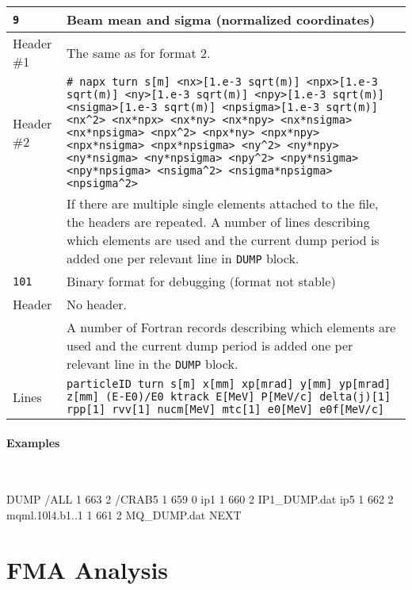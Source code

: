 \begin{center}
\begin{longtable}{|p{1.8cm}|p{13.8cm}|}
        \hline
        \rowcolor{blue!15}
        \texttt{9} & Beam mean and sigma (normalized coordinates) \\
        \hline
        Header \#1 & The same as for format 2.\\
        \hline
        Header \#2 & \texttt{\# napx turn s[m] <nx>[1.e-3 sqrt(m)] <npx>[1.e-3 sqrt(m)] <ny>[1.e-3 sqrt(m)] <npy>[1.e-3 sqrt(m)] <nsigma>[1.e-3 sqrt(m)] <npsigma>[1.e-3 sqrt(m)] <nx\^{}2> <nx*npx> <nx*ny> <nx*npy> <nx*nsigma> <nx*npsigma> <npx\^{}2> <npx*ny> <npx*npy> <npx*nsigma> <npx*npsigma> <ny\^{}2> <ny*npy> <ny*nsigma> <ny*npsigma> <npy\^{}2> <npy*nsigma> <npy*npsigma> <nsigma\^{}2> <nsigma*npsigma> <npsigma\^{}2>}\vspace{1mm}\\
                   & If there are multiple single elements attached to the file, the headers are repeated. A number of lines describing which elements are used and the current dump period is added one per relevant line in \texttt{DUMP} block.\\
        \hline
        \rowcolor{blue!15}
        \texttt{101} & Binary format for debugging (format not stable) \\
        \hline
        Header & No header.\vspace{1mm}\\
               & A number of Fortran records describing which elements are used and the current dump period is added one per relevant line in the \texttt{DUMP} block.\\
        \hline
        Lines  & \texttt{particleID turn s[m] x[mm] xp[mrad] y[mm] yp[mrad] z[mm] (E-E0)/E0 ktrack E[MeV] P[MeV/c] delta(j)[1] rpp[1] rvv[1] nucm[MeV] mtc[1] e0[MeV] e0f[MeV/c] } \\
       \end{longtable}
\end{center}

\paragraph{Examples}~
\begin{cverbatim}
DUMP
/ALL 1 663 2
/CRAB5 1 659 0
ip1 1 660 2 IP1_DUMP.dat
ip5 1 662 2
mqml.10l4.b1..1 1 661 2 MQ_DUMP.dat
NEXT
\end{cverbatim}

\section{FMA Analysis} \label{sec:FMA}

